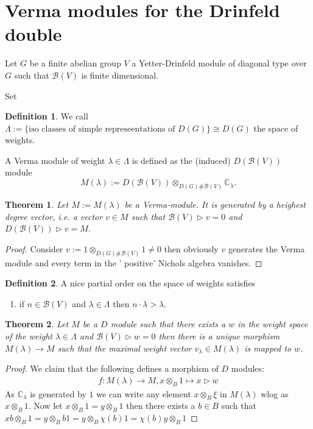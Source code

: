 \documentclass{amsart}
\newtheorem{theorem}{Theorem}
\theoremstyle{definition}
\newtheorem{definition}{Definition}
\newcommand{\Nichols}[1]{\ensuremath{\mathcal{B}(#1)}}
\begin{document}
\section{Verma modules for the Drinfeld double}

Let $G$ be a finite abelian group $V$ a Yetter-Drinfeld module of diagonal type over $G$ such that $\Nichols V$ is finite dimensional.

Set
\begin{definition}
	We call $\Lambda := \{ \text{iso classes of simple represeentations of } D(G)\}\cong D(G)$ the space of weights.
	
	A Verma module of weight $\lambda\in \Lambda$ is defined as the (induced) $D(\Nichols V)$ module
	$$
		M(\lambda):= D(\Nichols V)\otimes _{D(G)\# \Nichols V} \mathbb C_\lambda.
	$$
\end{definition}

\begin{theorem}
	Let $M:=M(\lambda)$ be a Verma-module. It is generated by a heighest degree vector, i.e. a vector $v\in M$ such that $\Nichols V \triangleright v =0 $ and $D(\Nichols V)\triangleright v = M$.
\end{theorem}
\begin{proof}
	Consider $v:= 1 \otimes_{D(G)\# \Nichols V} 1\neq 0$ then obviously $v$ generates the Verma module and every term in the ' positive' Nichols algebra vanishes.
\end{proof}

\begin{definition}
	A nice partial order on the space of weights satisfies
	\begin{enumerate}
		\item if $n\in \Nichols V$ and $\lambda \in \Lambda$ then $n\cdot \lambda > \lambda$.
	\end{enumerate}
\end{definition}

\begin{theorem}
	Let $M$ be a $D$ module such that there exists a $w$ in the weight space of the weight $\lambda\in \Lambda$ and $\Nichols V \triangleright w =0$ then there is a unique morphism 
	$M(\lambda)\rightarrow M$ such that the maximal weight vector $v_\lambda \in M(\lambda)$ is mapped to $w$.
\end{theorem}
\begin{proof}
	We claim that the following defines a morphism of $D$ modules:
	\begin{align*}
		f:M(\lambda) \rightarrow M, x \otimes_B 1 \mapsto x \triangleright w 
	\end{align*}
	As $\mathbb C_\lambda $ is generated by $1$ we can write any element $x\otimes_B \xi$  in $M(\lambda)$ wlog as $x \otimes_B 1$.
	Now let $x\otimes_B 1 = y \otimes_B 1$ then there exists a $b\in B$ such that 
	$x b \otimes_B 1 = y \otimes_B b1 = y \otimes_B \chi(b)1 = \chi(b) y\otimes_B 1$
\end{proof}
\end{document}
